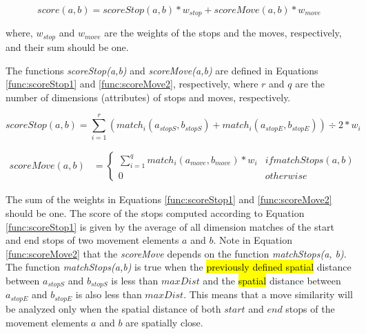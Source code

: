 \documentclass[12pt]{article}
\begin{document}
\begin{equation}
\label{func:score1}
score(a, b) = scoreStop(a, b) * w_{stop} + scoreMove(a, b) * w_{move}  
\end{equation}

where, $w_{stop}$ and $w_{move}$ are the weights of the stops and the moves, respectively, and their sum should be one.

The functions \emph{scoreStop(a,b)} and \emph{scoreMove(a,b)} are defined in Equations \ref{func:scoreStop1} and \ref{func:scoreMove2}, respectively, where $r$ and $q$ are the number of dimensions (attributes) of stops and moves, respectively.


\begin{equation}
\label{func:scoreStop1}
  scoreStop(a, b) = \sum\limits_{i=1}^r (match_i(a_{stopS}, b_{stopS}) + match_i(a_{stopE}, b_{stopE}))\div 2* w_{i}
\end{equation}


\begin{equation}
\label{func:scoreMove2}
\begin{split}
scoreMove(a, b)  & = 
  \begin{cases} 
      \sum\limits_{i=1}^q match_i(a_{move}, b_{move}) * w_{i} & if matchStops(a, b)\\
      0 & otherwise
  \end{cases}
\end{split}
\end{equation}


The sum of the weights in Equations \ref{func:scoreStop1} and \ref{func:scoreMove2} should be one.
The score of the stops computed according to Equation \ref{func:scoreStop1} is given by the average of all dimension matches of the start and end stops of two movement elements $a$ and $b$. Note in Equation \ref{func:scoreMove2} that the \emph{scoreMove} depends on the function \textit{matchStops(a, b)}.
The function \emph{matchStops(a,b)} is true when the \hl{previously defined spatial} distance between $a_{stopS}$ and $b_{stopS}$ is less than $maxDist$ and the \hl{spatial} distance between $a_{stopE}$ and $b_{stopE}$ is also less than $maxDist$. This means that a move similarity will be analyzed only when the spatial distance of both $start$ and $end$ stops of the movement elements $a$ and $b$ are spatially close. 
\end{document}
